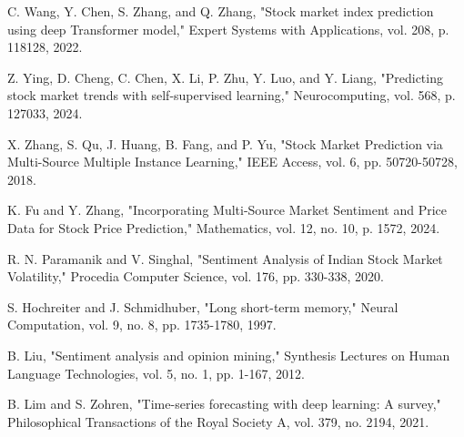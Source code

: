 \documentclass[conference]{IEEEtran}
\begin{document}
\begin{thebibliography}{00}
 C. Wang, Y. Chen, S. Zhang, and Q. Zhang, "Stock market index prediction using deep Transformer model," Expert Systems with Applications, vol. 208, p. 118128, 2022.

 Z. Ying, D. Cheng, C. Chen, X. Li, P. Zhu, Y. Luo, and Y. Liang, "Predicting stock market trends with self-supervised learning," Neurocomputing, vol. 568, p. 127033, 2024.

 X. Zhang, S. Qu, J. Huang, B. Fang, and P. Yu, "Stock Market Prediction via Multi-Source Multiple Instance Learning," IEEE Access, vol. 6, pp. 50720-50728, 2018.

 K. Fu and Y. Zhang, "Incorporating Multi-Source Market Sentiment and Price Data for Stock Price Prediction," Mathematics, vol. 12, no. 10, p. 1572, 2024.

 R. N. Paramanik and V. Singhal, "Sentiment Analysis of Indian Stock Market Volatility," Procedia Computer Science, vol. 176, pp. 330-338, 2020.

 S. Hochreiter and J. Schmidhuber, "Long short-term memory," Neural Computation, vol. 9, no. 8, pp. 1735-1780, 1997.

 B. Liu, "Sentiment analysis and opinion mining," Synthesis Lectures on Human Language Technologies, vol. 5, no. 1, pp. 1-167, 2012.

 B. Lim and S. Zohren, "Time-series forecasting with deep learning: A survey," Philosophical Transactions of the Royal Society A, vol. 379, no. 2194, 2021.
\end{thebibliography}
\end{document}
